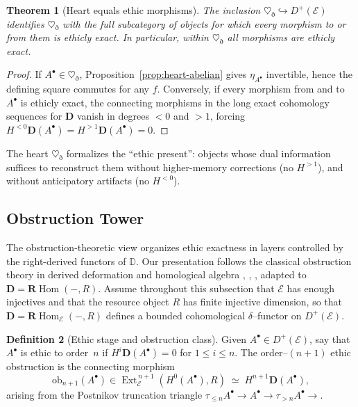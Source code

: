 \documentclass[12pt]{article}
\newcommand{\ob}{\mathrm{ob}}
\newcommand{\E}{\mathcal{E}}
\newcommand{\DD}{\mathbb{D}}
\newcommand{\Ext}{\operatorname{Ext}}
\newcommand{\RHom}{\mathbf{R}\!\operatorname{Hom}}
\newcommand{\Dplus}{D^{+}}
\theoremstyle{plain}
\newtheorem{theorem}{Theorem}[section]
\theoremstyle{definition}
\newtheorem{definition}[theorem]{Definition}
\theoremstyle{remark}
\numberwithin{equation}{section}
\begin{document}
\begin{theorem}[Heart equals ethic morphisms]\label{thm:heart-eth}
The inclusion \(\heartsuit_{\eth}\hookrightarrow \Dplus(\E)\) identifies \(\heartsuit_{\eth}\) with the full subcategory of objects for which every morphism to or from them is ethicly exact. In particular, within \(\heartsuit_{\eth}\) all morphisms are ethicly exact.
\end{theorem}

\begin{proof}
If \(A^\bullet\in\heartsuit_{\eth}\), Proposition~\ref{prop:heart-abelian} gives \(\eta_{A^\bullet}\) invertible, hence the defining square commutes for any \(f\). Conversely, if every morphism from and to \(A^\bullet\) is ethicly exact, the connecting morphisms in the long exact cohomology sequences for \(\mathbf D\) vanish in degrees \(<0\) and \(>1\), forcing \(H^{<0}\mathbf D(A^\bullet)=H^{>1}\mathbf D(A^\bullet)=0\).
\end{proof}

The heart \(\heartsuit_{\eth}\) formalizes the ``ethic present'': objects whose dual information suffices to reconstruct them without higher-memory corrections (no \(H^{>1}\)), and without anticipatory artifacts (no \(H^{<0}\)).

\subsection{Obstruction Tower}\label{sec:obstruction-tower}

The obstruction-theoretic view organizes ethic exactness in layers controlled by the right-derived functors of \(\DD\). Our presentation follows the classical obstruction theory in derived deformation and homological algebra \cite{Illusie1971}, \cite{ArtinMazur1969}, \cite{GelfandManin2003}, adapted to \(\mathbf D=\RHom(-,R)\). Assume throughout this subsection that $\E$ has enough injectives and
that the resource object $R$ has finite injective dimension, so that
$\mathbf D=\RHom_\E(-,R)$ defines a bounded cohomological $\delta$–functor
on $\Dplus(\E)$.

\begin{definition}[Ethic stage and obstruction class]\label{def:stage}
Given $A^\bullet\in D^+(\E)$, say that $A^\bullet$ is
ethic to order~$n$ if $H^i\mathbf D(A^\bullet)=0$ for
$1\le i\le n$.
The order–$(n{+}1)$ ethic obstruction is the connecting morphism
\[
\ob_{n+1}(A^\bullet)\in
\Ext^{\,n+1}_\E(H^0(A^\bullet),R)
\;\simeq\;
H^{n+1}\mathbf D(A^\bullet),
\]
arising from the Postnikov truncation triangle
$\tau_{\le n}A^\bullet\to A^\bullet\to\tau_{>n}A^\bullet\to$.
\end{definition}
\end{document}
